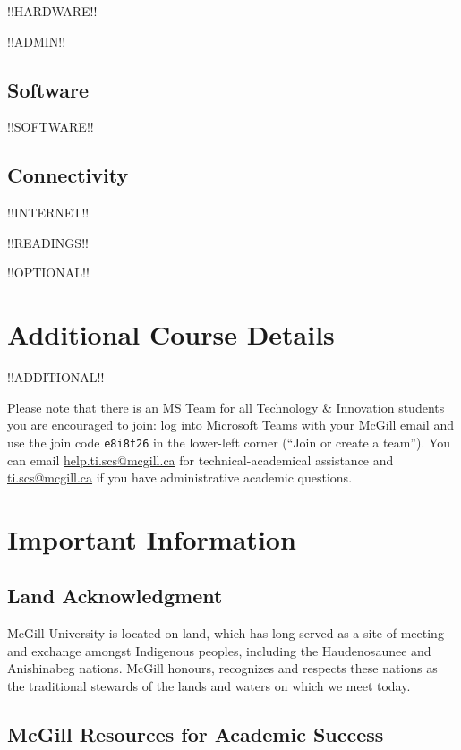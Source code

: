 \documentclass{article}
\begin{document}
!!HARDWARE!!

!!ADMIN!!

\subsection{Software}

!!SOFTWARE!!

\subsection{Connectivity}

!!INTERNET!!

\newpage

!!READINGS!!

!!OPTIONAL!!

\section{{Additional Course Details}}

!!ADDITIONAL!!

Please note that there is an MS Team for all Technology \& Innovation
students you are encouraged to join: log into Microsoft Teams with
your McGill email and use the join code \texttt{e8i8f26} in the
lower-left corner (``Join or create a team''). You can email
\href{mailto:help.ti.scs@mcgill.ca}{help.ti.scs@mcgill.ca} for
technical-academical assistance and
\href{mailto:ti.scs@mcgill.ca}{ti.scs@mcgill.ca} if you have
administrative academic questions.

\newpage


\section{Important Information}

\subsection{Land Acknowledgment}

McGill University is located on land, which has long served as a site
of meeting and exchange amongst Indigenous peoples, including the
Haudenosaunee and Anishinabeg nations. McGill honours, recognizes and
respects these nations as the traditional stewards of the lands and
waters on which we meet today.

\subsection{McGill Resources for Academic Success}
\end{document}
